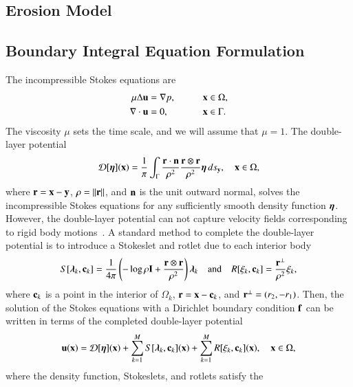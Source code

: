 \documentclass[preprint, 10pt]{elsarticle}
\begin{document}
\subsection{Erosion Model} 


\subsection{Boundary Integral Equation Formulation} 
The incompressible Stokes equations are
\begin{alignat*}{3}
  \mu\Delta {\mathbf{u}} &= {\nabla} p, \qquad && {\mathbf{x}} \in \Omega, \\
  {\nabla} \cdot {\mathbf{u}} &= 0,   && {\mathbf{x}} \in \Gamma.
\end{alignat*}
The viscosity $\mu$ sets the time scale, and we will assume that
$\mu=1$.  The double-layer potential
\begin{align}
  {\mathcal{D}}[{\boldsymbol\eta}]({\mathbf{x}}) = \frac{1}{\pi} \int_{\Gamma} 
    \frac{{\mathbf{r}} \cdot {\mathbf{n}}}{\rho^2} \frac{{\mathbf{r}} \otimes {\mathbf{r}}}{\rho^2} 
    {\boldsymbol\eta} \, ds_{\mathbf{y}}, \quad {\mathbf{x}} \in \Omega,
    \label{eqn:dlp}
\end{align}
where ${\mathbf{r}} = {\mathbf{x}} - {\mathbf{y}}$, $\rho = \|{\mathbf{r}}\|$, and ${\mathbf{n}}$ is the unit outward
normal, solves the incompressible Stokes equations for any sufficiently
smooth density function ${\boldsymbol\eta}$.  However, the double-layer potential can not capture velocity fields
corresponding to rigid body motions~\cite{pow-mir1987}.  A standard
method to complete the double-layer potential is to introduce a
Stokeslet and rotlet due to each interior body
\begin{align}
  S[{\boldsymbol\lambda}_k,{\mathbf{c}}_k] = \frac{1}{4\pi} \left(-\log \rho {\mathbf{I}} + 
    \frac{{\mathbf{r}} \otimes {\mathbf{r}}}{\rho^2} \right){\boldsymbol\lambda}_k
  \quad \text{and} \quad
  R[\xi_k,{\mathbf{c}}_k] = \frac{{\mathbf{r}}^\perp}{\rho^2}\xi_k,
  \label{eqn:stokeslet_rotlet}
\end{align}
where ${\mathbf{c}}_k$ is a point in the interior of $\Omega_k$, ${\mathbf{r}} = {\mathbf{x}} -
{\mathbf{c}}_k$, and ${\mathbf{r}}^\perp = (r_2,-r_1)$.  Then, the solution of the Stokes
equations with a Dirichlet boundary condition ${\mathbf{f}}$ can be written in
terms of the completed double-layer potential
\begin{align}
  {\mathbf{u}}({\mathbf{x}}) = {\mathcal{D}}[{\boldsymbol\eta}]({\mathbf{x}}) + \sum_{k=1}^{M} S[{\boldsymbol\lambda}_k,{\mathbf{c}}_k]({\mathbf{x}}) +
              \sum_{k=1}^{M} R[\xi_k,{\mathbf{c}}_k]({\mathbf{x}}), \quad {\mathbf{x}} \in \Omega,
  \label{eqn:completedDLP}
\end{align}
where the density function, Stokeslets, and rotlets satisfy the
\end{document}
